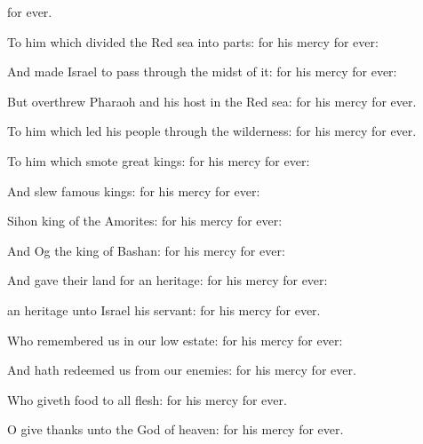 {{} for
ever.
\par }{\Q {}To him which
divided the
Red
sea into
parts: for his
mercy
{} for
ever:
\par }{\Q {}And made
Israel to pass
through the
midst of it: for his
mercy
{} for
ever:
\par }{\Q {}But
overthrew
Pharaoh and his
host in the
Red
sea: for his
mercy
{} for
ever.
\par }{\Q {}To him which
led his
people through the
wilderness: for his
mercy
{} for
ever.
\par }{\Q {}To him which
smote
great
kings: for his
mercy
{} for
ever:
\par }{\Q {}And
slew
famous
kings: for his
mercy
{} for
ever:
\par }{\Q {}Sihon
king of the
Amorites: for his
mercy
{} for
ever:
\par }{\Q {}And
Og the
king of
Bashan: for his
mercy
{} for
ever:
\par }{\Q {}And
gave their
land for an
heritage: for his
mercy
{} for
ever:
\par }{\Q {} an
heritage unto
Israel his
servant: for his
mercy
{} for
ever.
\par }{\BB \par }{\Q {}Who
remembered us in our low
estate: for his
mercy
{} for
ever:
\par }{\Q {}And hath
redeemed us from our
enemies: for his
mercy
{} for
ever.
\par }{\Q {}Who
giveth
food to all
flesh: for his
mercy
{} for
ever.
\par }{\Q {}O give
thanks unto the
God of
heaven: for his
mercy
{} for
ever.

}
